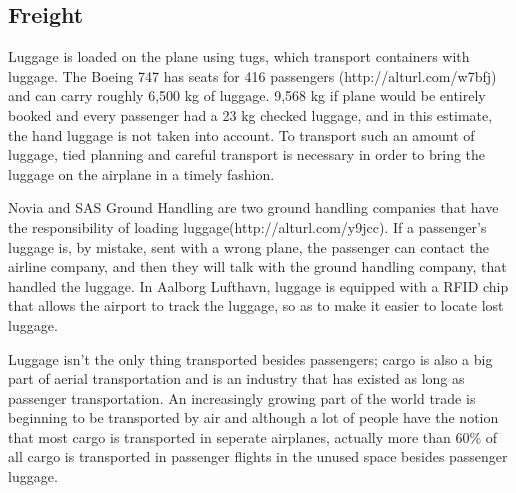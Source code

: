 \subsection{Freight}
Luggage is loaded on the plane using tugs, which transport containers with luggage. The Boeing 747 has seats for 416 passengers (http://alturl.com/w7bfj) and can carry roughly 6,500 kg of luggage. %
9,568 kg if plane would be entirely booked and every passenger had a 23 kg checked luggage, and in this estimate, the hand luggage is not taken into account. To transport such an amount of luggage, tied planning and careful transport is necessary in order to bring the luggage on the airplane in a timely fashion. %


Novia and SAS Ground Handling are two ground handling companies that have the responsibility of loading luggage(http://alturl.com/y9jcc). If a passenger's luggage is, by mistake, sent with a wrong plane, the passenger can contact the airline company, and then they will talk with the ground handling company, that handled the luggage. In Aalborg Lufthavn, luggage is equipped with a RFID chip that allows the airport to track the luggage, so as to make it easier to locate lost luggage.


Luggage isn't the only thing transported besides passengers; cargo is also a big part of aerial transportation and is an industry that has existed as long as passenger transportation. An increasingly growing part of the world trade is beginning to be transported by air and although a lot of people have the notion that most cargo is transported in seperate airplanes, actually more than 60\% of all cargo is transported in passenger flights in the unused space besides passenger luggage.


